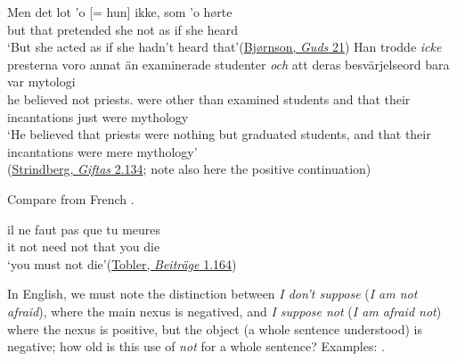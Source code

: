 \ex
\gll Men det lot {'o [= hun]} ikke, som 'o hørte\\
 but that pretended she not {as if} she heard\\
\glt `But she acted as if she hadn't heard that'\hfill(\href{https://www.nb.no/items/URN:NBN:no-nb_digibok_2008072810004?page=31&searchText=%22Men%20det%20lot%22}{Bjørnson, \textit{Guds} 21})
\ex
\gll Han trodde \textit{icke} presterna voro annat än examinerade studenter \textit{och} att deras besvärjelseord bara var mytologi\\
 he believed not priests.\DEF{} were other than examined students and that their incantations just were mythology\\
\glt `He believed that priests were nothing but graduated students, and that their incantations were mere mythology'\\\hfill(\href{https://litteraturbanken.se/f%C3%B6rfattare/StrindbergA/titlar/GiftasII1886/sida/134/faksimil}{Strindberg, \textit{Giftas} 2.134}; note also here the positive continuation) 
\z
\z

Compare from French .

\ea \label{ex:05-103}
\gll il ne faut pas que tu meures\\
 it not need not that you die\\
\glt `you must not die'\hfill(\href{https://archive.org/details/vermischtebeitr04toblgoog/page/n197/mode/2up?view=theater&q=%22faut+pas+que+tu+meures%22}{Tobler, \textit{Beiträge} 1.164})
\z
{}

In English, we must note the distinction between \textit{I don't suppose} (\textit{I am not afraid}), where the main nexus is negatived, and \textit{I suppose not} (\textit{I am afraid not}) where the nexus is positive, but the object (a whole sentence understood) is negative; how old is this use of \textit{not} for a whole sentence? Examples: .

